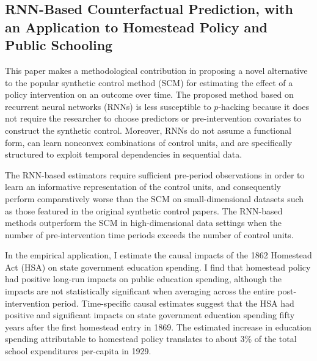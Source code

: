 \subsection{RNN-Based Counterfactual Prediction, with an Application to Homestead Policy and Public Schooling}

This paper makes a methodological contribution in proposing a novel alternative to the popular synthetic control method (SCM) for estimating the effect of a policy intervention on an outcome over time. The proposed method based on recurrent neural networks (RNNs) is less susceptible to $p$-hacking because it does not require the researcher to choose predictors or pre-intervention covariates to construct the synthetic control. Moreover, RNNs do not assume a functional form, can learn nonconvex combinations of control units, and are specifically structured to exploit temporal dependencies in sequential data.

The RNN-based estimators require sufficient pre-period observations in order to learn an informative representation of the control units, and consequently perform comparatively worse than the SCM on small-dimensional datasets such as those featured in the original synthetic control papers. The RNN-based methods outperform the SCM in high-dimensional data settings when the number of pre-intervention time periods exceeds the number of control units.

In the empirical application, I estimate the causal impacts of the 1862 Homestead Act (HSA) on state government education spending. I find that homestead policy had positive long-run impacts on public education spending, although the impacts are not statistically significant when averaging across the entire post-intervention period. Time-specific causal estimates suggest that the HSA had positive and significant impacts on state government education spending fifty years after the first homestead entry in 1869. The estimated increase in education spending attributable to homestead policy translates to about 3\% of the total school expenditures per-capita in 1929.